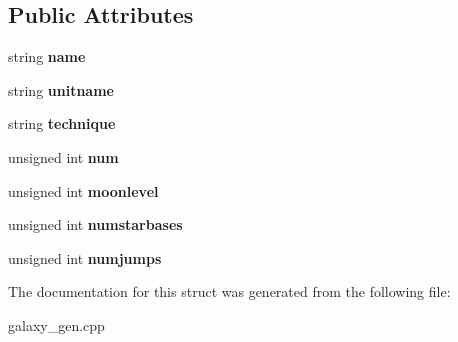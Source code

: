 \subsection*{Public Attributes}
\begin{DoxyCompactItemize}
\item 
string {\bfseries name}\hypertarget{structStarSystemGent_1_1PlanetInfo_ad2e0796449567f0a87feb71e0b53c4c0}{}\label{structStarSystemGent_1_1PlanetInfo_ad2e0796449567f0a87feb71e0b53c4c0}

\item 
string {\bfseries unitname}\hypertarget{structStarSystemGent_1_1PlanetInfo_a3c2a66754fea496cc9722f825838a55c}{}\label{structStarSystemGent_1_1PlanetInfo_a3c2a66754fea496cc9722f825838a55c}

\item 
string {\bfseries technique}\hypertarget{structStarSystemGent_1_1PlanetInfo_a3329770236f848b10b17cfa8711865a2}{}\label{structStarSystemGent_1_1PlanetInfo_a3329770236f848b10b17cfa8711865a2}

\item 
unsigned int {\bfseries num}\hypertarget{structStarSystemGent_1_1PlanetInfo_a3be5d744fc2dbf7545bdd6d5d66ae8ae}{}\label{structStarSystemGent_1_1PlanetInfo_a3be5d744fc2dbf7545bdd6d5d66ae8ae}

\item 
unsigned int {\bfseries moonlevel}\hypertarget{structStarSystemGent_1_1PlanetInfo_ad4323f77d6ecc7a5949bb8aa9e107b97}{}\label{structStarSystemGent_1_1PlanetInfo_ad4323f77d6ecc7a5949bb8aa9e107b97}

\item 
unsigned int {\bfseries numstarbases}\hypertarget{structStarSystemGent_1_1PlanetInfo_a174f9507adefa1d5829f94e5315730e5}{}\label{structStarSystemGent_1_1PlanetInfo_a174f9507adefa1d5829f94e5315730e5}

\item 
unsigned int {\bfseries numjumps}\hypertarget{structStarSystemGent_1_1PlanetInfo_a020a91e2601a8e4c4b2efcd5b8243459}{}\label{structStarSystemGent_1_1PlanetInfo_a020a91e2601a8e4c4b2efcd5b8243459}

\end{DoxyCompactItemize}


The documentation for this struct was generated from the following file\+:\begin{DoxyCompactItemize}
\item 
galaxy\+\_\+gen.\+cpp\end{DoxyCompactItemize}
